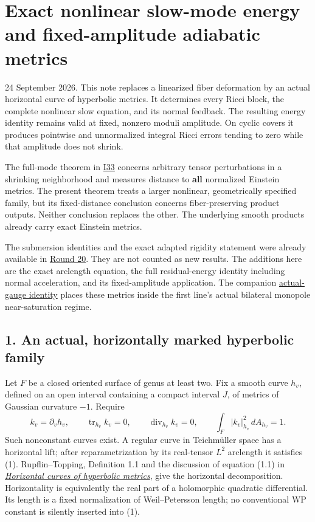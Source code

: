 \documentclass[
  11pt,
]{article}
\author{}
\date{}
\begin{document}
\hypertarget{exact-nonlinear-slow-mode-energy-and-fixed-amplitude-adiabatic-metrics}{%
\section{Exact nonlinear slow-mode energy and fixed-amplitude adiabatic
metrics}\label{exact-nonlinear-slow-mode-energy-and-fixed-amplitude-adiabatic-metrics}}

24 September 2026. This note replaces a linearized fiber deformation by
an actual horizontal curve of hyperbolic metrics. It determines every
Ricci block, the complete nonlinear slow equation, and its normal
feedback. The resulting energy identity remains valid at fixed, nonzero
moduli amplitude. On cyclic covers it produces pointwise and
unnormalized integral Ricci errors tending to zero while that amplitude
does not shrink.

The full-mode theorem in
\href{20260924_integrable_kernel_cyclic_repair.md}{I33} concerns
arbitrary tensor perturbations in a shrinking neighborhood and measures
distance to \textbf{all} normalized Einstein metrics. The present
theorem treats a larger nonlinear, geometrically specified family, but
its fixed-distance conclusion concerns fiber-preserving product outputs.
Neither conclusion replaces the other. The underlying smooth products
already carry exact Einstein metrics.

The submersion identities and the exact adapted rigidity statement were
already available in
\href{../mathematics/current/round20_construction.md}{Round 20}. They
are not counted as new results. The additions here are the exact
arclength equation, the full residual-energy identity including normal
acceleration, and its fixed-amplitude application. The companion
\href{20260924_moduli_energy_gauge.md}{actual-gauge identity} places
these metrics inside the first line's actual bilateral monopole
near-saturation regime.

\hypertarget{an-actual-horizontally-marked-hyperbolic-family}{%
\subsection{1. An actual, horizontally marked hyperbolic
family}\label{an-actual-horizontally-marked-hyperbolic-family}}

Let \(F\) be a closed oriented surface of genus at least two. Fix a
smooth curve \(h_v\), defined on an open interval containing a compact
interval \(J\), of metrics of Gaussian curvature \(-1\). Require \[
 k_v=\partial_vh_v,\qquad
 \operatorname{tr}_{h_v}k_v=0,\qquad
 \operatorname{div}_{h_v}k_v=0,\qquad
 \int_F|k_v|_{h_v}^2\,dA_{h_v}=1.
 \tag{1}
\] Such nonconstant curves exist. A regular curve in Teichmüller space
has a horizontal lift; after reparametrization by its real-tensor
\(L^2\) arclength it satisfies (1). Rupflin--Topping, Definition 1.1 and
the discussion of equation (1.1) in
\href{https://link.springer.com/article/10.1007/s00526-018-1386-y}{\emph{Horizontal
curves of hyperbolic metrics}}, give the horizontal decomposition.
Horizontality is equivalently the real part of a holomorphic quadratic
differential. Its length is a fixed normalization of Weil--Petersson
length; no conventional WP constant is silently inserted into (1).
\end{document}
